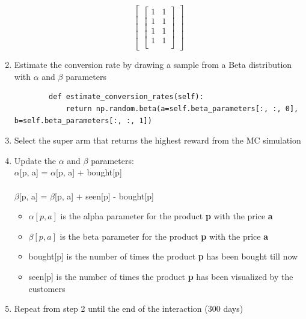 \begin{enumerate}
\[\begin{bmatrix}
\begin{bmatrix}
        1 & 1\\
        1 & 1\\
        1 & 1\\
        1 & 1\\
    \end{bmatrix}
    \end{bmatrix} \]
    \item Estimate the conversion rate by drawing a sample from a Beta distribution with $\alpha$ and $\beta$ parameters \begin{verbatim}
        def estimate_conversion_rates(self):
            return np.random.beta(a=self.beta_parameters[:, :, 0], b=self.beta_parameters[:, :, 1])
        \end{verbatim}
    \item Select the super arm that returns the highest reward from the MC simulation
    \item Update the $\alpha$ and $\beta$ parameters:\\
        $\alpha$[p, a] = $\alpha$[p, a] + bought[p]\\\\
        $\beta$[p, a] = $\beta$[p, a] + seen[p] - bought[p]
    \begin{itemize}
        \item $\alpha[p, a]$ is the alpha parameter for the product {\bf p} with the price {\bf a}
        \item $\beta[p, a]$ is the beta parameter for the product {\bf p} with the price {\bf a}
        \item bought[p] is the number of times the product {\bf p} has been bought till now
        \item seen[p] is the number of times the product {\bf p} has been visualized by the customers
    \end{itemize}
    \item Repeat from step 2 until the end of the interaction (300 days)
\end{enumerate}
